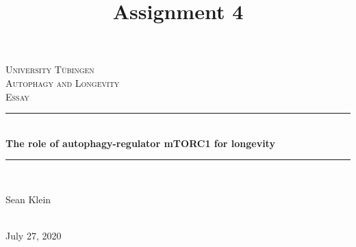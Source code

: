 \documentclass[12pt]{article} %
\begin{document}

\begin{titlepage}
\title{Assignment 4}
\newcommand{\HRule}{\rule{\linewidth}{0.5mm}} %


\center %

\textsc{\LARGE University Tübingen}\\[1.5cm] %
\textsc{\Large Autophagy and Longevity}\\[0.5cm] %
\textsc{\large Essay}\\[0.5cm]

\HRule \\[0.5cm]
 \huge \bfseries The role of autophagy-regulator  mTORC1 for longevity\\ %
\HRule \\[0.5 cm]



\begin{minipage}{0.4\textwidth}
\begin{center} \large
Sean Klein%
\end{center}
\end{minipage}
\\[4cm]

{\large July 27, 2020}\\[3cm] %


\vfill %

\end{titlepage}


\tableofcontents %
\end{document}

